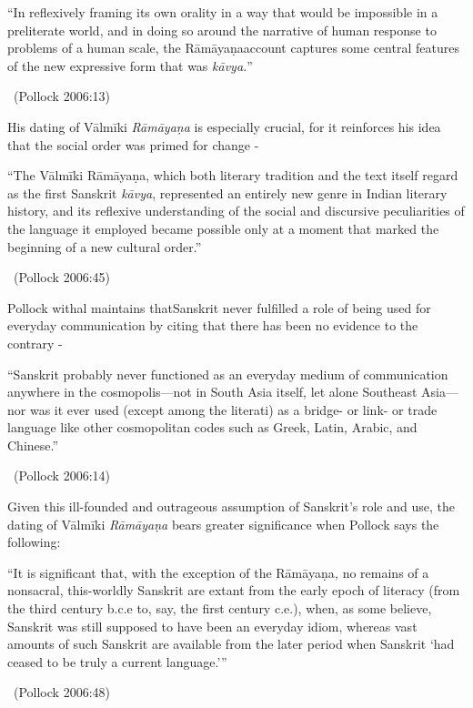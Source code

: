 \begin{myquote}
“In reflexively framing its own orality in a way that would be impossible in a preliterate world, and in doing so around the narrative of human response to problems of a human scale, the Rāmāyaṇaaccount captures some central features of the new expressive form that was \textit{kāvya.}” 

~\hfill (Pollock 2006:13)
\end{myquote}

His dating of Vālmīki \textit{Rāmāyaṇa} is especially crucial, for it reinforces his idea that the social order was primed for change -

\begin{myquote}
“The Vālmīki Rāmāyaṇa, which both literary tradition and the text itself regard as the first Sanskrit \textit{kāvya}, represented an entirely new genre in Indian literary history, and its reflexive understanding of the social and discursive peculiarities of the language it employed became possible only at a moment that marked the beginning of a new cultural order.” 

~\hfill (Pollock 2006:45)
\end{myquote}

Pollock withal maintains thatSanskrit never fulfilled a role of being used for everyday communication by citing that there has been no evidence to the contrary -

\begin{myquote}
“Sanskrit probably never functioned as an everyday medium of communication anywhere in the cosmopolis—not in South Asia itself, let alone Southeast Asia— nor was it ever used (except among the literati) as a bridge- or link- or trade language like other cosmopolitan codes such as Greek, Latin, Arabic, and Chinese.” 

~\hfill (Pollock 2006:14)
\end{myquote}

Given this ill-founded and outrageous assumption of Sanskrit’s role and use, the dating of Vālmīki \textit{Rāmāyaṇa} bears greater significance when Pollock says the following:

\begin{myquote}
“It is significant that, with the exception of the Rāmāyaṇa\textit{,} no remains of a nonsacral, this-worldly Sanskrit are extant from the early epoch of literacy (from the third century b.c.e to, say, the first century c.e.), when, as some believe, Sanskrit was still supposed to have been an everyday idiom, whereas vast amounts of such Sanskrit are available from the later period when Sanskrit ‘had ceased to be truly a current language.’” 

~\hfill (Pollock 2006:48)
\end{myquote}

